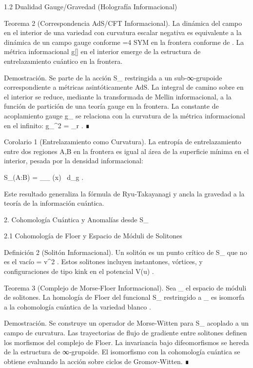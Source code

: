 \documentclass[12pt,a4paper]{book}
\begin{document}
1.2 Dualidad Gauge/Gravedad (Holografía Informacional)

Teorema 2 (Correspondencia AdS/CFT Informacional). La dinámica del campo  \rho  en el interior de una variedad    con curvatura escalar negativa es equivalente a la dinámica de un campo gauge conforme  =4  SYM en la frontera conforme de   . La métrica informacional  g[\rho]  en el interior emerge de la estructura de entrelazamiento cuántico en la frontera.

Demostración. Se parte de la acción  S_{}  restringida a un sub‑∞‑grupoide correspondiente a métricas asintóticamente AdS. La integral de camino sobre  \rho  en el interior se reduce, mediante la transformada de Mellin informacional, a la función de partición de una teoría gauge en la frontera. La constante de acoplamiento gauge  g_{}  se relaciona con la curvatura de la métrica informacional en el infinito:  g_{}^2 = \lim_{r\to\infty}  . ∎

Corolario 1 (Entrelazamiento como Curvatura). La entropía de entrelazamiento entre dos regiones  A,B  en la frontera es igual al área de la superficie mínima en el interior, pesada por la densidad informacional:

S_{}(A:B) =  \int_{\Sigma_{\min}} \rho(x) \, d_g .

Este resultado generaliza la fórmula de Ryu‑Takayanagi y ancla la gravedad a la teoría de la información cuántica.

2. Cohomología Cuántica y Anomalías desde  S_{} 

2.1 Cohomología de Floer y Espacio de Móduli de Solitones

Definición 2 (Solitón Informacional). Un solitón es un punto crítico de  S_{}  que no es el vacío  \rho = v^2 . Estos solitones incluyen instantones, vórtices, y configuraciones de tipo kink en el potencial  V(u) .

Teorema 3 (Complejo de Morse‑Floer Informacional). Sea  _{}  el espacio de móduli de solitones. La homología de Floer del funcional  S_{}  restringido a  _{}  es isomorfa a la cohomología cuántica de la variedad blanco   .

Demostración. Se construye un operador de Morse‑Witten para  S_{}  acoplado a un campo de curvatura. Las trayectorias de flujo de gradiente entre solitones definen los morfismos del complejo de Floer. La invariancia bajo difeomorfismos se hereda de la estructura de ∞‑grupoide. El isomorfismo con la cohomología cuántica se obtiene evaluando la acción sobre ciclos de Gromov‑Witten. ∎
\end{document}
